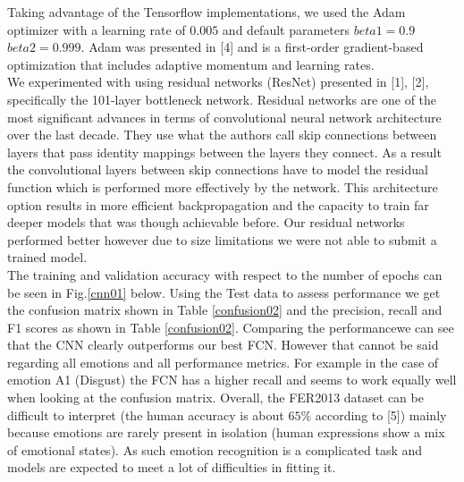 \documentclass[12pt,twoside]{article}
\begin{document}
Taking advantage of the Tensorflow implementations, we used the Adam optimizer with a learning rate of $0.005$ and default parameters $beta1=0.9$ $beta2=0.999$. Adam was presented in [4] and is a first-order gradient-based optimization that includes adaptive momentum and learning rates. \\


We experimented with using residual networks (ResNet) presented in [1], [2], specifically the 101-layer bottleneck network. Residual networks are one of the most significant advances in terms of convolutional neural network architecture over the last decade. They use what the authors call skip connections between layers that pass identity mappings between the layers they connect. As a result the convolutional layers between skip connections have to model the residual function which is performed more effectively by the network. This architecture option results in more efficient backpropagation and the capacity to train far deeper models that was though achievable before. Our residual networks performed better however due to size limitations we were not able to submit a trained model.\\

The training and validation accuracy with respect to the number of epochs can be seen in Fig.\ref{cnn01} below. Using the Test data to assess performance we get the confusion matrix shown in Table \ref{confusion02} and the precision, recall and F1 scores as shown in Table \ref{confusion02}. Comparing the performancewe can see that the CNN clearly outperforms our best FCN. However that cannot be said regarding all emotions and all performance metrics. For example in the case of emotion A1 (Disgust) the FCN has a higher recall and seems to work equally well when looking at the confusion matrix. Overall, the FER2013 dataset can be difficult to interpret (the human accuracy is about $65\%$ according to [5]) mainly because emotions are rarely present in isolation (human expressions show a mix of emotional states). As such emotion recognition is a complicated task and models are expected to meet a lot of difficulties in fitting it.
\end{document}
